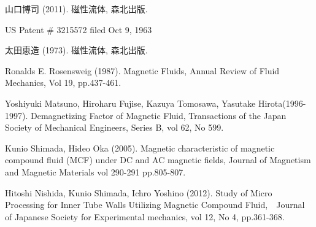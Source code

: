 \documentclass[b5,twocolumn,11pt]{jarticle}
\begin{document}
\begin{thebibliography}{99}

山口博司 (2011). 磁性流体, 森北出版.

US Patent \# 3215572 filed Oct 9, 1963

太田恵造 (1973). 磁性流体, 森北出版.

Ronalds E. Rosensweig (1987). Magnetic Fluids, Annual Review of Fluid Mechanics, Vol 19, pp.437-461.

Yoshiyuki Matsuno, Hiroharu Fujise, Kazuya Tomosawa, Yasutake Hirota(1996-1997). Demagnetizing Factor of Magnetic Fluid, Transactions of the Japan Society of Mechanical Engineers, Series B, vol 62, No 599.

Kunio Shimada, Hideo Oka (2005). Magnetic characteristic of magnetic compound fluid (MCF) under DC and AC magnetic fields, Journal of Magnetism and Magnetic Materials vol 290-291 pp.805-807.

 Hitoshi Nishida, Kunio Shimada, Ichro Yoshino (2012). Study of Micro Processing for Inner Tube Walls Utilizing Magnetic Compound Fluid,　Journal of Japanese Society for Experimental mechanics, vol 12, No 4, pp.361-368. 

\end{thebibliography}
\end{document}
